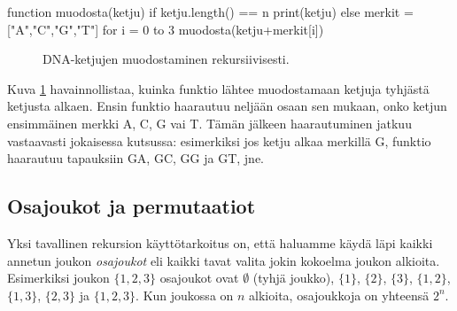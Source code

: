 \begin{code}
function muodosta(ketju)
    if ketju.length() == n
        print(ketju)
    else
        merkit = ["A","C","G","T"]
        for i = 0 to 3
            muodosta(ketju+merkit[i])
\end{code}

\begin{figure}
\center
{}
\caption{DNA-ketjujen muodostaminen rekursiivisesti.}
\label{fig:ketjut}
\end{figure}

Kuva \ref{fig:ketjut} havainnollistaa,
kuinka funktio lähtee muodostamaan ketjuja tyhjästä ketjusta alkaen.
Ensin funktio haarautuu neljään osaan sen mukaan,
onko ketjun ensimmäinen merkki A, C, G vai T.
Tämän jälkeen haarautuminen jatkuu vastaavasti
jokaisessa kutsussa:
esimerkiksi jos ketju alkaa merkillä G,
funktio haarautuu tapauksiin GA, GC, GG ja GT, jne.

\subsection{Osajoukot ja permutaatiot}

Yksi tavallinen rekursion käyttötarkoitus on,
että haluamme käydä läpi kaikki annetun joukon \emph{osajoukot}
eli kaikki tavat valita jokin kokoelma joukon alkioita.
Esimerkiksi joukon $\{1,2,3\}$ osajoukot ovat
$\emptyset$ (tyhjä joukko), $\{1\}$, $\{2\}$, $\{3\}$,
$\{1,2\}$, $\{1,3\}$, $\{2,3\}$ ja $\{1,2,3\}$.
Kun joukossa on $n$ alkioita, osa\-joukkoja on yhteensä $2^n$.

